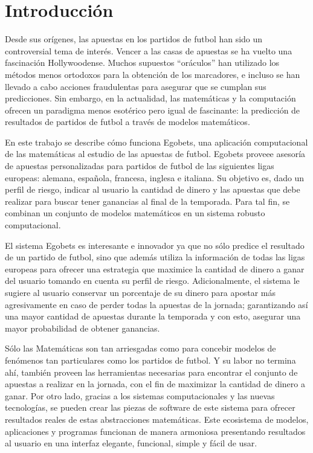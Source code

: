 \chapter{Introducción}

Desde sus orígenes, las apuestas en los partidos de futbol han sido un controversial tema de interés. Vencer a las casas de apuestas se ha vuelto una fascinación Hollywoodense. Muchos supuestos ``oráculos'' han utilizado los métodos menos ortodoxos para la obtención de los marcadores, e incluso se han llevado a cabo acciones fraudulentas para asegurar que se cumplan sus predicciones. Sin embargo, en la actualidad, las matemáticas y la computación ofrecen un paradigma menos esotérico pero igual de fascinante: la predicción de resultados de partidos de futbol a través de modelos matemáticos.

En este trabajo se describe cómo funciona Egobets, una aplicación computacional de las matemáticas al estudio de las apuestas de futbol. Egobets proveee asesoría de apuestas personalizadas para partidos de futbol de las siguientes ligas europeas: alemana, española, francesa, inglesa e italiana. Su objetivo es, dado un perfil de riesgo, indicar al usuario la cantidad de dinero y las apuestas que debe realizar para buscar tener ganancias al final de la temporada. Para tal fin, se combinan un conjunto de modelos matemáticos en un sistema robusto computacional.

El sistema Egobets es interesante e innovador ya que no sólo predice el resultado de un partido de futbol, sino que además utiliza la información de todas las ligas europeas para ofrecer una estrategia que maximice la cantidad de dinero a ganar del usuario tomando en cuenta su perfil de riesgo. Adicionalmente, el sistema le sugiere al usuario conservar un porcentaje de su dinero para apostar más agresivamente en caso de perder todas la apuestas de la jornada; garantizando así una mayor cantidad de apuestas durante la temporada y con esto, asegurar una mayor probabilidad de obtener ganancias.

Sólo las Matemáticas son tan arriesgadas como para concebir modelos de fenómenos tan particulares como los partidos de futbol. Y su labor no termina ahí, también proveen las herramientas necesarias para encontrar el conjunto de apuestas a realizar en la jornada, con el fin de maximizar la cantidad de dinero a ganar. Por otro lado, gracias a los sistemas computacionales y las nuevas tecnologías, se pueden crear las piezas de software de este sistema para ofrecer resultados reales de estas abstracciones matemáticas. Este ecosistema de modelos, aplicaciones y programas funcionan de manera armoniosa presentando resultados al usuario en una interfaz elegante, funcional, simple y fácil de usar. 

